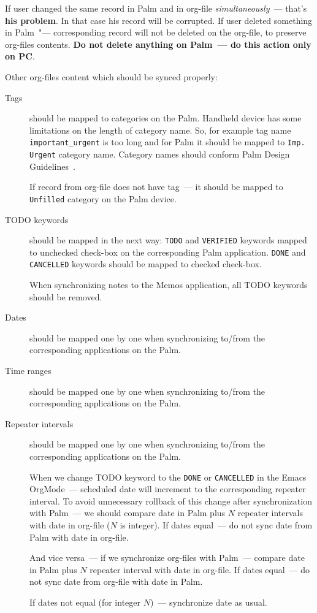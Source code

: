 \documentclass[a4paper,12pt,oneside]{scrartcl}
\begin{document}
If user changed the same record in Palm and in org-file
\textit{simultaneously}~--- that's \textbf{his problem}. In that case his record
will be corrupted. If user deleted something in Palm~"--- corresponding record
will not be deleted on the org-file, to preserve org-files contents. \textbf{Do
  not delete anything on Palm~--- do this action only on PC}.

Other org-files content which should be synced properly:
\begin{description}
\item[Tags] should be mapped to categories on the Palm. Handheld device has some
  limitations on the length of category name. So, for example tag name
  \texttt{important\_urgent} is too long and for Palm it should be mapped to
  \texttt{Imp.\,Urgent} category name. Category names should conform Palm Design
  Guidelines~\cite{PalmDesignGuide}.

  If record from org-file does not have tag~--- it should be mapped to
  \texttt{Unfilled} category on the Palm device.
\item[TODO keywords] should be mapped in the next way: \texttt{TODO} and
  \texttt{VERIFIED} keywords mapped to unchecked check-box on the corresponding
  Palm application. \texttt{DONE} and \texttt{CANCELLED} keywords should be
  mapped to checked check-box.

  When synchronizing notes to the Memos application, all TODO keywords should be
  removed.
\item[Dates] should be mapped one by one when synchronizing to/from the
  corresponding applications on the Palm.
\item[Time ranges] should be mapped one by one when synchronizing to/from the
  corresponding applications on the Palm.
\item[Repeater intervals] should be mapped one by one when synchronizing to/from
  the corresponding applications on the Palm.

  When we change TODO keyword to the \texttt{DONE} or \texttt{CANCELLED} in the
  Emacs OrgMode~--- scheduled date will increment to the corresponding repeater
  interval. To avoid unnecessary rollback of this change after synchronization
  with Palm~--- we should compare date in Palm plus $N$ repeater intervals with
  date in org-file ($N$ is integer). If dates equal~--- do not sync date from
  Palm with date in org-file.

  And vice versa~--- if we synchronize org-files with Palm~--- compare date in
  Palm plus $N$ repeater interval with date in org-file. If dates equal~--- do
  not sync date from org-file with date in Palm.

  If dates not equal (for integer $N$)~--- synchronize date as usual.
\end{description}
\end{document}
